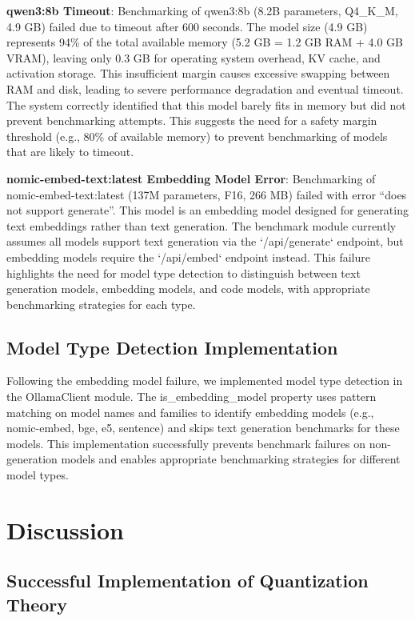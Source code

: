 \documentclass[journal]{IEEEtran}
\begin{document}
\textbf{qwen3:8b Timeout}: Benchmarking of qwen3:8b (8.2B parameters, Q4\_K\_M, 4.9 GB) failed due to timeout after 600 seconds. The model size (4.9 GB) represents 94\% of the total available memory (5.2 GB = 1.2 GB RAM + 4.0 GB VRAM), leaving only 0.3 GB for operating system overhead, KV cache, and activation storage. This insufficient margin causes excessive swapping between RAM and disk, leading to severe performance degradation and eventual timeout. The system correctly identified that this model barely fits in memory but did not prevent benchmarking attempts. This suggests the need for a safety margin threshold (e.g., 80\% of available memory) to prevent benchmarking of models that are likely to timeout.

\textbf{nomic-embed-text:latest Embedding Model Error}: Benchmarking of nomic-embed-text:latest (137M parameters, F16, 266 MB) failed with error ``does not support generate''. This model is an embedding model designed for generating text embeddings rather than text generation. The benchmark module currently assumes all models support text generation via the `/api/generate` endpoint, but embedding models require the `/api/embed` endpoint instead. This failure highlights the need for model type detection to distinguish between text generation models, embedding models, and code models, with appropriate benchmarking strategies for each type.

\subsection{Model Type Detection Implementation}

Following the embedding model failure, we implemented model type detection in the OllamaClient module. The is\_embedding\_model property uses pattern matching on model names and families to identify embedding models (e.g., nomic-embed, bge, e5, sentence) and skips text generation benchmarks for these models. This implementation successfully prevents benchmark failures on non-generation models and enables appropriate benchmarking strategies for different model types.

\section{Discussion}

\subsection{Successful Implementation of Quantization Theory}
\end{document}
